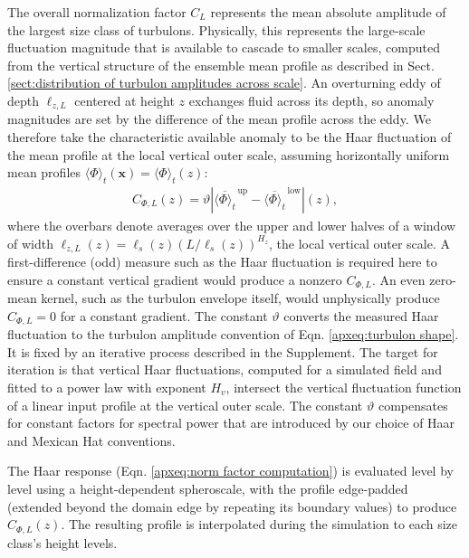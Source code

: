 \documentclass[acp, manuscript, english]{copernicus}
\begin{document}
The overall normalization factor $C_L$
represents the mean absolute amplitude of the largest size class of turbulons. Physically, this represents the large-scale fluctuation magnitude that is available to cascade to smaller scales, computed from the vertical structure of the ensemble mean profile as described in Sect. \ref{sect:distribution of turbulon amplitudes across scale}. An overturning eddy of depth $\ell_{z,L}$ centered at height $z$ exchanges fluid across its depth, so anomaly magnitudes are set by the difference of the mean profile across the eddy. We therefore take the characteristic available anomaly to be the Haar fluctuation of the mean profile at the local vertical outer scale, assuming horizontally uniform mean profiles $\langle \Phi\rangle_t(\mathbf{x}) = \langle \Phi\rangle_t(z)$:
\begin{align}
  C_{\Phi, L}(z) = \vartheta \left| \overline{\langle \Phi \rangle_t}^{\,\mathrm{up}} - \overline{\langle \Phi \rangle_t}^{\,\mathrm{low}} \right|(z), \label{apxeq:norm factor computation}
\end{align}
where the overbars denote averages over the upper and lower halves of a window of width $\ell_{z,L}(z) = \ell_s(z)\left(L/\ell_s(z)\right)^{H_z}$, the local vertical outer scale. A first-difference (odd) measure such as the Haar fluctuation is required here to ensure a constant vertical gradient would produce a nonzero $C_{\Phi,L}$. An even zero-mean kernel, such as the turbulon envelope itself, would unphysically produce $C_{\Phi,L}=0$ for a constant gradient. The constant $\vartheta$ converts the measured Haar fluctuation to the turbulon amplitude convention of Eqn. \ref{apxeq:turbulon shape}. It is fixed by an iterative process described in the Supplement. The target for iteration is that vertical Haar fluctuations, computed for a simulated field and fitted to a power law with exponent $H_v$, intersect the vertical fluctuation function of a linear input profile at the vertical outer scale. The constant $\vartheta$ compensates for constant factors for spectral power that are introduced by our choice of Haar and Mexican Hat conventions. 

The Haar response (Eqn. \ref{apxeq:norm factor computation}) is evaluated level by level using a height-dependent spheroscale, with the profile edge-padded (extended beyond the domain edge by repeating its boundary values) to produce $C_{\Phi,L}(z)$. The resulting profile is interpolated during the simulation to each size class's height levels. 
\end{document}
